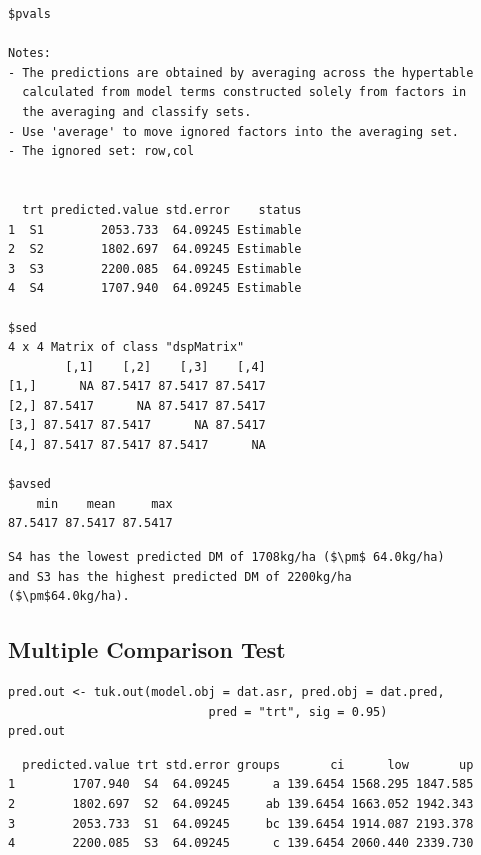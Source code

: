 \documentclass[a4paper, 10pt, fleqn, twosided]{memoir}
\begin{document}
\begin{tcolorbox}[title = Example 4 Predicted output]
\begin{verbatim}
$pvals

Notes:
- The predictions are obtained by averaging across the hypertable
  calculated from model terms constructed solely from factors in
  the averaging and classify sets.
- Use 'average' to move ignored factors into the averaging set.
- The ignored set: row,col


  trt predicted.value std.error    status
1  S1        2053.733  64.09245 Estimable
2  S2        1802.697  64.09245 Estimable
3  S3        2200.085  64.09245 Estimable
4  S4        1707.940  64.09245 Estimable

$sed
4 x 4 Matrix of class "dspMatrix"
        [,1]    [,2]    [,3]    [,4]
[1,]      NA 87.5417 87.5417 87.5417
[2,] 87.5417      NA 87.5417 87.5417
[3,] 87.5417 87.5417      NA 87.5417
[4,] 87.5417 87.5417 87.5417      NA

$avsed
    min    mean     max
87.5417 87.5417 87.5417
\end{verbatim}
\end{tcolorbox}

\begin{tcolorbox}[title = Example 4 Prediction interpretation]
\begin{lstlisting}
S4 has the lowest predicted DM of 1708kg/ha ($\pm$ 64.0kg/ha)
and S3 has the highest predicted DM of 2200kg/ha
($\pm$64.0kg/ha).
\end{lstlisting}
\end{tcolorbox}%
\subsection{Multiple Comparison Test}

\begin{tcolorbox}[title = Example 4 Tukey's multiple comparison]
\begin{verbatim}
pred.out <- tuk.out(model.obj = dat.asr, pred.obj = dat.pred,
                            pred = "trt", sig = 0.95)
pred.out
\end{verbatim}
\end{tcolorbox}

\begin{tcolorbox}[title = Example 4 Tukey's multiple comparison output]
\begin{verbatim}
  predicted.value trt std.error groups       ci      low       up
1        1707.940  S4  64.09245      a 139.6454 1568.295 1847.585
2        1802.697  S2  64.09245     ab 139.6454 1663.052 1942.343
3        2053.733  S1  64.09245     bc 139.6454 1914.087 2193.378
4        2200.085  S3  64.09245      c 139.6454 2060.440 2339.730

\end{verbatim}
\end{tcolorbox}
\end{document}
